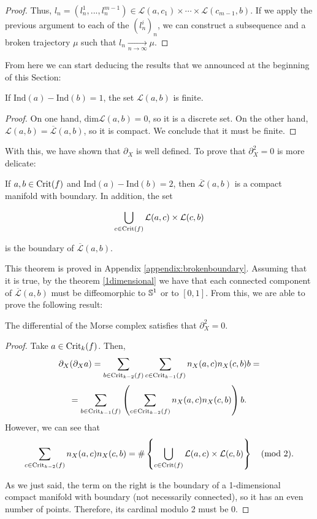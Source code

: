 \begin{proof}
Thus, $l_n = (l_n^1,...,l_n^{m-1}) \in \mathcal{L}(a,c_1) \times \cdots \times \mathcal{L}(c_{m-1},b)$. If we apply the previous argument to each of the $(l_n^i)_n$, we can construct a subsequence and a broken trajectory $\mu$ such that $l_n \xrightarrow[n \rightarrow \infty]{} \mu$.
\end{proof}

From here we can start deducing the results that we announced at the beginning of this Section:
\begin{coro}
If $\text{Ind}(a)-\text{Ind}(b) = 1$, the set $\mathcal{L}(a,b)$ is finite.
\end{coro}

\begin{proof}
On one hand, $\text{dim} \mathcal{L}(a,b) = 0$, so it is a discrete set. On the other hand, $\mathcal{L}(a,b) = \overline{\mathcal{L}}(a,b)$, so it is compact. We conclude that it must be finite.
\end{proof}

With this, we have shown that $\partial_X$ is well defined. To prove that $\partial_X^2 = 0$ is more delicate:

\begin{theo} \label{morse_brokenboundary}
If $a, b \in \mathrm{Crit}(f)$ and $\text{Ind}(a)-\text{Ind}(b) = 2$, then $\overline{\mathcal{L}}(a,b)$ is a compact manifold with boundary. In addition, the set

\[\bigcup_{c \in \mathrm{Crit}(f)} \mathcal{L}(a,c) \times \mathcal{L}(c,b)\]

is the boundary of $\overline{\mathcal{L}}(a,b)$.
\end{theo}

This theorem is proved in Appendix \ref{appendix:brokenboundary}. Assuming that it is true, by the theorem \ref{1dimensional} we have that each connected component of $\overline{\mathcal{L}}(a,b)$ must be diffeomorphic to $\mathbb{S}^1$ or to $[0,1]$. From this, we are able to prove the following result:

\begin{coro} The differential of the Morse complex satisfies that $\partial_X^2 = 0$.
\end{coro}

\begin{proof}
Take $a \in \mathrm{Crit}_k(f)$. Then,
\[\partial_X (\partial_X a) = \sum_{b \in \mathrm{Crit}_{k-2}(f)} \sum_{c \in \mathrm{Crit}_{k-1}(f)} n_X(a,c) n_X(c,b) b =\]
\[= \sum_{b \in \mathrm{Crit}_{k-1}(f)} \left( \sum_{c \in \mathrm{Crit}_{k-2}(f)} n_X(a,c) n_X(c,b) \right) b .\]
However, we can see that
\[\sum_{c \in \mathrm{Crit}_{k-2}(f)} n_X(a,c) n_X(c,b) = \# \left\{ \bigcup_{c \in \mathrm{Crit}(f)} \mathcal{L}(a,c) \times \mathcal{L}(c,b) \right\} \quad (\text{mod } 2).\]

As we just said, the term on the right is the boundary of a 1-dimensional compact manifold with boundary (not necessarily connected), so it has an even number of points. Therefore, its cardinal modulo 2 must be 0.
\end{proof}
